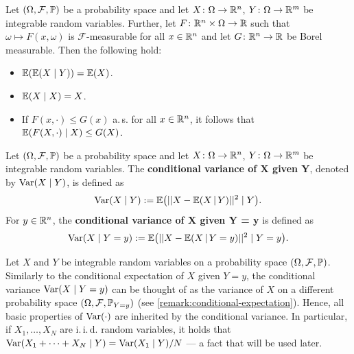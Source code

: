 \begin{proposition}
    \label{prop:conditional-expectation-properties}
    Let $(\Omega, \mathcal{F}, \mathbb{P})$ be a probability space and
    let $X\colon \Omega \to \mathbb{R}^n$, $Y\colon \Omega \to \mathbb{R}^m$ be integrable random variables. Further, let $F\colon\mathbb{R}^n\times \Omega\to\mathbb{R}$ such that
    $\omega\mapsto F(x, \omega)$ is $\mathcal{F}$-measurable for all $x\in\mathbb{R}^n$ and let $G\colon\mathbb{R}^n\to\mathbb{R}$
    be Borel measurable. Then the following hold:
    \begin{itemize}
        \item[\textnormal{(i)}] $\mathbb{E}(\mathbb{E}(X \mid Y)) = \mathbb{E}(X)$.
        \item[\textnormal{(ii)}] $\mathbb{E}(X \mid X) = X$.
        \item[\textnormal{(iii)}] If $F(x, \cdot) \leq G(x)$ a.\,s. for all $x\in\mathbb{R}^n$, it follows that $\mathbb{E}(F(X, \cdot) \mid X) \leq G(X)$.
    \end{itemize}
\end{proposition}

\begin{definition}
    Let $(\Omega, \mathcal{F}, \mathbb{P})$ be a probability space and
    let $X\colon \Omega \to \mathbb{R}^n$, $Y\colon \Omega \to \mathbb{R}^m$ be integrable random variables.
    The \textbf{conditional variance of X given Y}, denoted by $\operatorname{Var}(X \mid Y)$, is defined as
    \[
        \operatorname{Var}(X \mid Y) := \mathbb{E}\big( ||X - \mathbb{E}(X \, | \, Y)||^2 \mid Y \big).
    \]
    For $y\in\mathbb{R}^n$, the \textbf{conditional variance of X given Y = y} is defined as
    \[
        \operatorname{Var}(X \mid Y = y) := \mathbb{E}\big( ||X - \mathbb{E}(X \, | \, Y = y)||^2 \mid Y = y \big).
    \]
\end{definition}

\begin{remark}
    Let $X$ and $Y$ be integrable random variables on a probability space $(\Omega, \mathcal{F}, \mathbb{P})$.
    Similarly to the conditional expectation of $X$ given $Y = y$, the conditional variance
    $\operatorname{Var}(X \mid Y = y)$ can be thought of as the variance of $X$ on a different probability
    space $(\Omega, \mathcal{F}, \mathbb{P}_{Y=y})$ (see \cref{remark:conditional-expectation}).
    Hence, all basic properties of $\operatorname{Var}(\cdot)$ are inherited by the conditional variance.
    In particular, if $X_1,\dots, X_N$ are i.\,i.\,d. random variables, it holds that
    $\operatorname{Var}(X_1 + \cdots + X_N \mid Y) = \operatorname{Var}(X_1 \mid Y) / N$ --- a fact that will be used later.
\end{remark}

